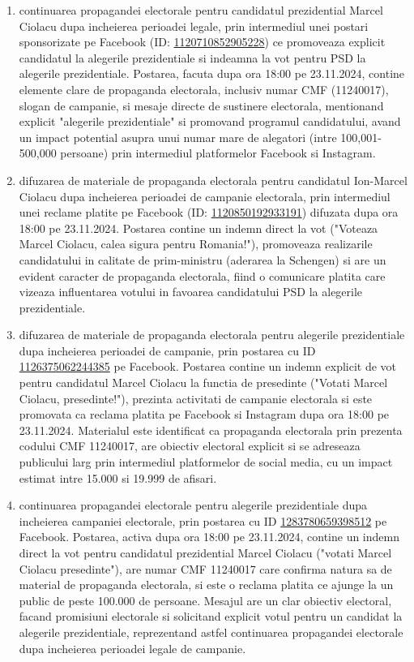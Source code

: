 \documentclass[a4paper,12pt]{article}
\begin{document}
\begin{enumerate}[leftmargin=*, label=\arabic*.)]
    \item continuarea propagandei electorale pentru candidatul prezidential Marcel Ciolacu dupa incheierea perioadei legale, prin intermediul unei postari sponsorizate pe Facebook (ID: \href{https://www.facebook.com/ads/library/?id=1120710852905228}{1120710852905228}) ce promoveaza explicit candidatul la alegerile prezidentiale si indeamna la vot pentru PSD la alegerile prezidentiale. Postarea, facuta dupa ora 18:00 pe 23.11.2024, contine elemente clare de propaganda electorala, inclusiv numar CMF (11240017), slogan de campanie, si mesaje directe de sustinere electorala, mentionand explicit "alegerile prezidentiale" si promovand programul candidatului, avand un impact potential asupra unui numar mare de alegatori (intre 100,001-500,000 persoane) prin intermediul platformelor Facebook si Instagram.
    \item difuzarea de materiale de propaganda electorala pentru candidatul Ion-Marcel Ciolacu dupa incheierea perioadei de campanie electorala, prin intermediul unei reclame platite pe Facebook (ID: \href{https://www.facebook.com/ads/library/?id=1120850192933191}{1120850192933191}) difuzata dupa ora 18:00 pe 23.11.2024. Postarea contine un indemn direct la vot ("Voteaza Marcel Ciolacu, calea sigura pentru Romania!"), promoveaza realizarile candidatului in calitate de prim-ministru (aderarea la Schengen) si are un evident caracter de propaganda electorala, fiind o comunicare platita care vizeaza influentarea votului in favoarea candidatului PSD la alegerile prezidentiale.
    \item difuzarea de materiale de propaganda electorala pentru alegerile prezidentiale dupa incheierea perioadei de campanie, prin postarea cu ID \href{https://www.facebook.com/ads/library/?id=1126375062244385}{1126375062244385} pe Facebook. Postarea contine un indemn explicit de vot pentru candidatul Marcel Ciolacu la functia de presedinte ("Votati Marcel Ciolacu, presedinte!"), prezinta activitati de campanie electorala si este promovata ca reclama platita pe Facebook si Instagram dupa ora 18:00 pe 23.11.2024. Materialul este identificat ca propaganda electorala prin prezenta codului CMF 11240017, are obiectiv electoral explicit si se adreseaza publicului larg prin intermediul platformelor de social media, cu un impact estimat intre 15.000 si 19.999 de afisari.
    \item continuarea propagandei electorale pentru alegerile prezidentiale dupa incheierea campaniei electorale, prin postarea cu ID \href{https://www.facebook.com/ads/library/?id=1283780659398512}{1283780659398512} pe Facebook. Postarea, activa dupa ora 18:00 pe 23.11.2024, contine un indemn direct la vot pentru candidatul prezidential Marcel Ciolacu ("votati Marcel Ciolacu presedinte"), are numar CMF 11240017 care confirma natura sa de material de propaganda electorala, si este o reclama platita ce ajunge la un public de peste 100.000 de persoane. Mesajul are un clar obiectiv electoral, facand promisiuni electorale si solicitand explicit votul pentru un candidat la alegerile prezidentiale, reprezentand astfel continuarea propagandei electorale dupa incheierea perioadei legale de campanie.

\end{enumerate}
\end{document}

